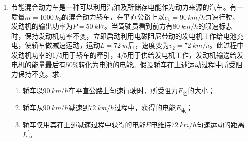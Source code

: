 \begin{enumerate}[leftmargin=0em]
{\begin{enumerate}
\end{enumerate}


}




\item 
{}
节能混合动力车是一种可以利用汽油及所储存电能作为动力来源的汽车。有一质量$ m=1000 \ kg $的混合动力轿车，在平直公路上以$ v_{1} =90 \ km/h $匀速行驶，发动机的输出功率为$ P=50\ kW $。当驾驶员看到前方有$ 80 \ km/h $的限速标志时，保持发动机功率不变，立即启动利用电磁阻尼带动的发电机工作给电池充电，使轿车做减速运动，运动$ L=72\ m $后，速度变为$ v_{2} =72 \ km/h $。此过程中发动机功率的$ 1/5 $用于轿车的牵引，$ 4/5 $用于供给发电机工作，发动机输送给发电机的能量最后有$ 50 \% $转化为电池的电能。假设轿车在上述运动过程中所受阻力保持不变。求:

\begin{enumerate}
\renewcommand{\labelenumi}{\arabic{enumi}.}
\item
轿车以$ 90 \ km/h $在平直公路上匀速行驶时，所受阻力$ F_{ \text{阻} } $的大小；
\item 
轿车从$ 90 \ km/h $减速到$ 72 \ km/h $过程中，获得的电能$ E_{ \text{电} } $；
\item 
轿车仅用其在上述减速过程中获得的电能$ E $电维持$ 72 \ km/h $匀速运动的距离$ L ^{\prime} $。



\end{enumerate}




\end{enumerate}
